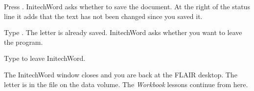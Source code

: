 \begin{WPSteps}
\item Press .  InitechWord asks whether to save the
document.  At the right of the status line it adds that the text has not
been changed since you saved it.
\item Type .  The letter is already saved.  InitechWord asks
whether you want to leave the program.
\item Type  to leave InitechWord.
\end{WPSteps}
\EndReplay
The InitechWord window closes and you are back at the FLAIR desktop.  The
letter is in the file  on the data volume.  The
\textit{Workbook} lessons continue from here.
